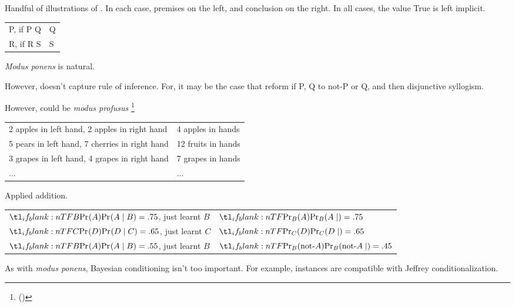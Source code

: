\begin{note}
  Handful of illustrations of .
  In each case, premises on the left, and conclusion on the right.
  In all cases, the value True is left implicit.

  \begin{illustration}
    \begin{tabular}[h]{p{.55\linewidth}|p{.4\linewidth}}
      P, if P Q & Q \\
      R, if R S & S \\
    \end{tabular}
  \end{illustration}

  \emph{Modus ponens} is natural.

  However, doesn't capture rule of inference.
  For, it may be the case that reform if P, Q to not-P or Q, and then disjunctive syllogism.

  However, could be \emph{modus profusus}%
  \footnote{
     (\cite[317]{Turri:2010aa})
    }


  \begin{illustration}
    \begin{tabular}[h]{p{.55\linewidth}|p{.4\linewidth}}
      2 apples in left hand, 2 apples in right hand & 4 apples in hands \\
      5 pears in left hand, 7 cherries in right hand & 12 fruits in hands \\
      3 grapes in left hand, 4 grapes in right hand & 7 grapes in hands \\
      \(\hdots\) & \(\hdots\)
    \end{tabular}
    Applied addition.
  \end{illustration}


  \begin{illustration}
    \begin{tabular}[h]{p{.55\linewidth}|p{.4\linewidth}}
      \(\pr[B]{A} = .75\), just learnt \(B\)  & \(\pr[][B]{A} = .75\) \\
      \(\pr[C]{D} = .65\), just learnt  \(C\) & \(\pr[][C]{D} = .65\) \\
      \(\pr[B]{A} = .55\), just learnt \(B\) & \(\pr[][B]{\text{not-}A} = .45\)
    \end{tabular}
  \end{illustration}

  As with \emph{modus ponens}, Bayesian conditioning isn't too important.
  For example, instances are compatible with Jeffrey conditionalization.
\end{note}

